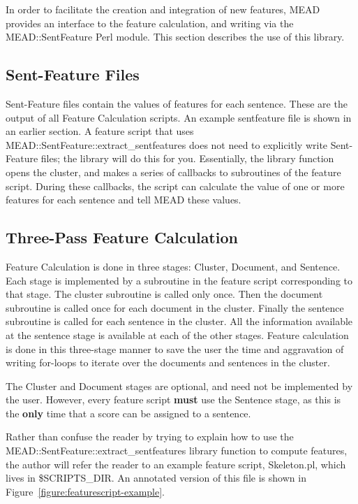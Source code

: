 \documentclass[10pt]{article}
\begin{document}
In order to facilitate the creation and integration of new
features, MEAD provides an interface to the feature calculation,
and writing via the MEAD::SentFeature Perl module.  
This section describes the use of this library.

\subsection{Sent-Feature Files}

Sent-Feature files contain the values of features for each sentence.
These are the output of all Feature Calculation scripts.  An
example sentfeature file is shown in an earlier section.
A feature script that uses
MEAD::SentFeature::\-extract\_sentfeatures
 does not need to
explicitly write Sent-Feature files;  the library will
do this for you.  Essentially, the library function opens the 
cluster, and makes a series of callbacks to subroutines of the
feature script.  During these callbacks, the script can calculate
the value of one or more features for each sentence and tell
MEAD these values.

\subsection{Three-Pass Feature Calculation}

Feature Calculation is done in three stages: Cluster, Document, and
Sentence.  Each stage is implemented by a subroutine in the
feature script corresponding to that stage.  The cluster
subroutine is called only once.  Then the document subroutine is 
called once for each document in the cluster.  Finally the
sentence subroutine is called for each sentence in the cluster.
All the information available at the sentence stage is available
at each of the other stages.  Feature calculation is done in 
this three-stage manner to save the user the time and aggravation
of writing for-loops to iterate over the documents and
sentences in the cluster.

The Cluster and Document stages are optional, and need not be
implemented by the user.  However, every feature script 
\textbf{must} use the Sentence stage, as this is the
\textbf{only} time that a score can be assigned to a sentence.

Rather than confuse the reader by trying to explain how to 
use the MEAD::SentFeature::extract\_sentfeatures library
function to compute features, the author will refer the reader
to an example feature script, Skeleton.pl, which lives
in \$SCRIPTS\_DIR.   An annotated version of this file is shown
in Figure~\ref{figure:featurescript-example}.
\end{document}
